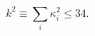 \begin{equation}
\label{ksquaredmax}
k^{2} \equiv \textstyle{\sum_{i}} \kappa^{2}_{i} \leq 34.
\end{equation}

